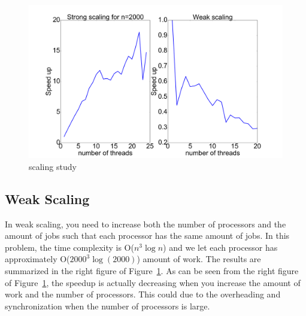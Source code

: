 \documentclass[11pt]{article}
\begin{document}
\begin{figure}
\caption{scaling study}
\label{scaling}
\includegraphics[height=0.4\textwidth, width=\textwidth]{scaling.png}
\end{figure}


\subsection{Weak Scaling}
In weak scaling, you need to increase both the number of processors and the amount of jobs such that each processor has the same amount of jobs. In this problem, the time complexity is O($n^3 \log n$) and we let each processor has approximately O($2000^3\log(2000)$) amount of work. The results are summarized in the right figure of Figure~\ref{scaling}. As can be seen from the right figure of Figure~\ref{scaling}, the speedup is actually decreasing when you increase the amount of work and the number of processors. This could due to the overheading and synchronization when the number of processors is large.
\end{document}
